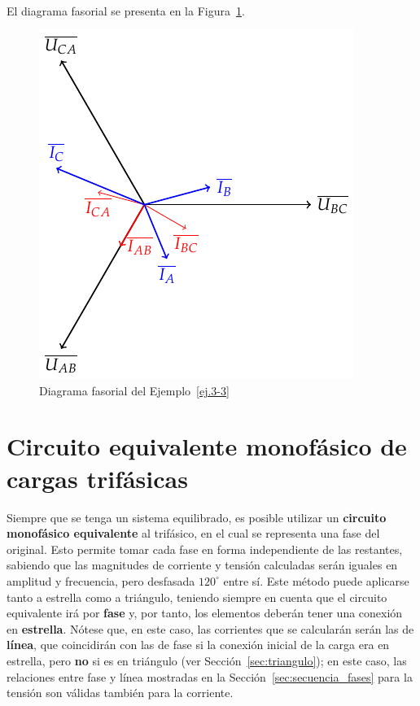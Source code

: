 \begin{example}
\begin{align*}
          \end{align*}
          El diagrama fasorial se presenta en la
          Figura~\ref{fig:diagrama_ejemplo_3-3}.
          \begin{figure}[H]
            \centering \includegraphics{../figs/diagrama_3_3.pdf}
            \caption{Diagrama fasorial del Ejemplo~\ref{ej.3-3}}
            \label{fig:diagrama_ejemplo_3-3}
          \end{figure}
	\end{example}
	
	\section{Circuito equivalente monofásico de cargas trifásicas}\label{sec:c_eq_mon}
	 Siempre que se tenga un sistema equilibrado, es posible utilizar un \textbf{circuito monofásico equivalente} al trifásico, en el cual se representa una fase del original. Esto permite tomar cada fase en forma independiente de las restantes, sabiendo que las magnitudes de corriente y tensión calculadas serán iguales en amplitud y frecuencia, pero desfasada $120^\circ$ entre sí. Este método puede aplicarse tanto a estrella como a triángulo, teniendo siempre en cuenta que el circuito equivalente irá por \textbf{fase} y, por tanto, los elementos deberán tener una conexión en \textbf{estrella}. Nótese que, en este caso, las corrientes que se calcularán serán las de \textbf{línea}, que coincidirán con las de fase si la conexión inicial de la carga era en estrella, pero \textbf{no} si es en triángulo (ver Sección~\ref{sec:triangulo}); en este caso, las relaciones entre fase y línea mostradas en la Sección~\ref{sec:secuencia_fases} para la tensión son válidas también para la corriente.
	 
